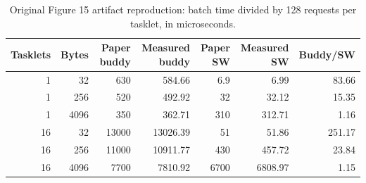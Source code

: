 \begin{table}[t]
\caption{Original Figure 15 artifact reproduction: batch time divided by 128 requests per tasklet, in microseconds.}\label{tab:baseline}
\centering\small
\begin{tabular}{rrrrrrr}\toprule
Tasklets & Bytes & Paper buddy & Measured buddy & Paper SW & Measured SW & Buddy/SW \\ \midrule
1 & 32 & 630 & 584.66 & 6.9 & 6.99 & 83.66 \\
1 & 256 & 520 & 492.92 & 32 & 32.12 & 15.35 \\
1 & 4096 & 350 & 362.71 & 310 & 312.71 & 1.16 \\
16 & 32 & 13000 & 13026.39 & 51 & 51.86 & 251.17 \\
16 & 256 & 11000 & 10911.77 & 430 & 457.72 & 23.84 \\
16 & 4096 & 7700 & 7810.92 & 6700 & 6808.97 & 1.15 \\
\bottomrule\end{tabular}
\par\vspace{2pt}{\footnotesize The original simulator layout is preserved here. These latencies are separate from the repaired allocator and 64 KiB WRAM configuration used for contributions.}
\end{table}
